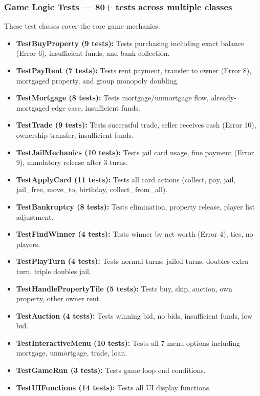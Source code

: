 \documentclass[12pt,a4paper]{article}
\begin{document}
\subsubsection{Game Logic Tests --- 80+ tests across multiple classes}
These test classes cover the core game mechanics:

\begin{itemize}
  \item \textbf{TestBuyProperty (9 tests):} Tests purchasing including exact balance (Error 6), insufficient funds, and bank collection.
  \item \textbf{TestPayRent (7 tests):} Tests rent payment, transfer to owner (Error 8), mortgaged property, and group monopoly doubling.
  \item \textbf{TestMortgage (8 tests):} Tests mortgage/unmortgage flow, already-mortgaged edge case, insufficient funds.
  \item \textbf{TestTrade (9 tests):} Tests successful trade, seller receives cash (Error 10), ownership transfer, insufficient funds.
  \item \textbf{TestJailMechanics (10 tests):} Tests jail card usage, fine payment (Error 9), mandatory release after 3 turns.
  \item \textbf{TestApplyCard (11 tests):} Tests all card actions (collect, pay, jail, jail\_free, move\_to, birthday, collect\_from\_all).
  \item \textbf{TestBankruptcy (8 tests):} Tests elimination, property release, player list adjustment.
  \item \textbf{TestFindWinner (4 tests):} Tests winner by net worth (Error 4), ties, no players.
  \item \textbf{TestPlayTurn (4 tests):} Tests normal turns, jailed turns, doubles extra turn, triple doubles jail.
  \item \textbf{TestHandlePropertyTile (5 tests):} Tests buy, skip, auction, own property, other owner rent.
  \item \textbf{TestAuction (4 tests):} Tests winning bid, no bids, insufficient funds, low bid.
  \item \textbf{TestInteractiveMenu (10 tests):} Tests all 7 menu options including mortgage, unmortgage, trade, loan.
  \item \textbf{TestGameRun (3 tests):} Tests game loop end conditions.
  \item \textbf{TestUIFunctions (14 tests):} Tests all UI display functions.
\end{itemize}
\end{document}

